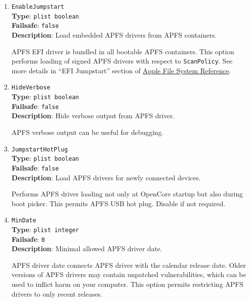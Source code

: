 \documentclass[]{article}
\begin{document}
\begin{enumerate}

\item
  \texttt{EnableJumpstart}\\
  \textbf{Type}: \texttt{plist\ boolean}\\
  \textbf{Failsafe}: \texttt{false}\\
  \textbf{Description}: Load embedded APFS drivers from APFS containers.

  APFS EFI driver is bundled in all bootable APFS containers. This
  option performs loading of signed APFS drivers with respect to
  \texttt{ScanPolicy}. See more details in ``EFI Jumpstart'' section of
  \href{https://developer.apple.com/support/apple-file-system/Apple-File-System-Reference.pdf}{Apple File System Reference}.

\item
  \texttt{HideVerbose}\\
  \textbf{Type}: \texttt{plist\ boolean}\\
  \textbf{Failsafe}: \texttt{false}\\
  \textbf{Description}: Hide verbose output from APFS driver.

  APFS verbose output can be useful for debugging.

\item
  \texttt{JumpstartHotPlug}\\
  \textbf{Type}: \texttt{plist\ boolean}\\
  \textbf{Failsafe}: \texttt{false}\\
  \textbf{Description}: Load APFS drivers for newly connected devices.

  Performs APFS driver loading not only at OpenCore startup but also
  during boot picker. This permits APFS USB hot plug. Disable if not
  required.

\item
  \texttt{MinDate}\\
  \textbf{Type}: \texttt{plist\ integer}\\
  \textbf{Failsafe}: \texttt{0}\\
  \textbf{Description}: Minimal allowed APFS driver date.

  APFS driver date connects APFS driver with the calendar
  release date. Older versions of APFS drivers may contain unpatched
  vulnerabilities, which can be used to inflict harm on your computer.
  This option permits restricting APFS drivers to only recent releases.


\end{enumerate}
\end{document}

